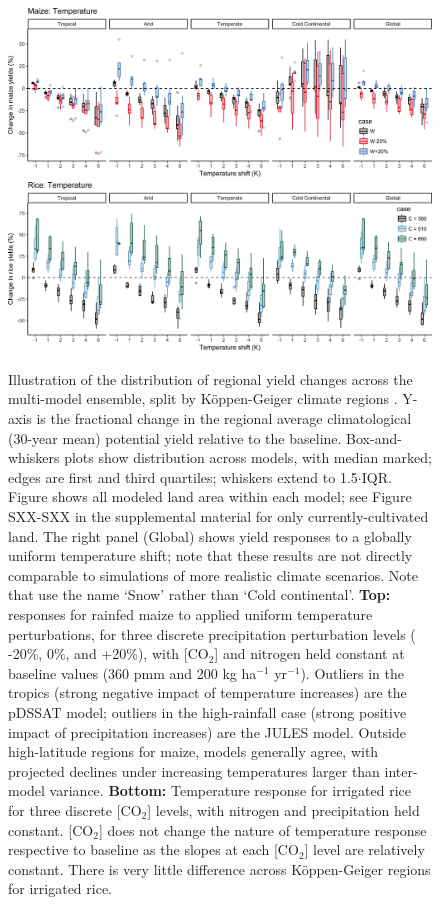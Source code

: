 \documentclass[gmd, manuscript]{copernicus} %
\begin{document}
\begin{figure}[ht]
\centering
   \includegraphics[width=15cm]{figures/maize_sim_CG_T.png}
   \includegraphics[width=15cm]{figures/rice_sim_CG_T.png}
   \caption{Illustration of the distribution of regional yield changes across the multi-model ensemble, split by K\"{o}ppen-Geiger climate regions \citep{rubel2010}.
  Y-axis is the fractional change in the regional average climatological (30-year mean) potential yield relative to the baseline. Box-and-whiskers plots show distribution across models, with median marked; edges are first and third quartiles; whiskers extend to 1.5$\cdot$IQR.
  Figure shows all modeled land area within each model; see Figure SXX-SXX in the supplemental material for only currently-cultivated land.
  The right panel (Global) shows yield responses to a globally uniform temperature shift; note that these results are not directly comparable to simulations of more realistic climate scenarios.
  Note that \citet{rubel2010} use the name `Snow' rather than `Cold continental'. 
  \textbf{Top:} responses for rainfed maize to applied uniform temperature perturbations, for three discrete precipitation perturbation levels ( -20\%, 0\%, and +20\%), with [CO$_2$] and nitrogen held constant at baseline values (360 pmm and 200 kg ha$^{-1}$ yr$^{-1}$). 
  Outliers in the tropics (strong negative impact of temperature increases) are the pDSSAT model; outliers in the high-rainfall case (strong positive impact of precipitation increases) are the JULES model. 
  Outside high-latitude regions for maize, models generally agree, with projected declines under increasing temperatures larger than inter-model variance. 
  \textbf{Bottom:} Temperature response for irrigated rice for three discrete [CO$_2$] levels, with nitrogen and precipitation held constant. [CO$_2$] does not change the nature of temperature response respective to baseline as the slopes at each [CO$_2$] level are relatively constant.
  There is very little difference across K\"{o}ppen-Geiger regions for irrigated rice.}
   \label{fig:maizerice}
\end{figure}
\end{document}
